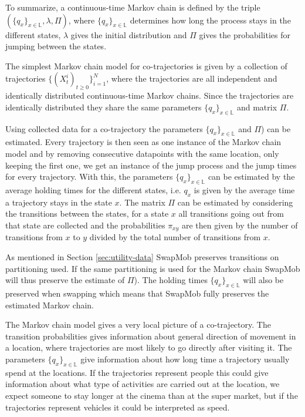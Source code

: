 \documentclass[12pt]{article}
\newcommand{\locset}{\mathbb{L}}
\theoremstyle{definition}
\begin{document}
To summarize, a continuous-time Markov chain is defined by the triple
\((\{q_{x}\}_{x \in \locset}, \lambda, \Pi)\), where
\(\{q_{x}\}_{x \in \locset}\) determines how long the process stays in
the different states, \(\lambda\) gives the initial distribution and
\(\Pi\) gives the probabilities for jumping between the states.

The simplest Markov chain model for co-trajectories is given by a
collection of trajectories \(\{(X_{t}^{i})_{t \geq 0}\}_{i = 1}^{N}\),
where the trajectories are all independent and identically distributed
continuous-time Markov chains. Since the trajectories are identically
distributed they share the same parameters
\(\{q_{x}\}_{x \in \locset}\) and matrix \(\Pi\).

Using collected data for a co-trajectory the parameters
\(\{q_{x}\}_{x \in \locset}\) and \(\Pi\)) can be estimated. Every
trajectory is then seen as one instance of the Markov chain model and
by removing consecutive datapoints with the same location, only
keeping the first one, we get an instance of the jump process and the
jump times for every trajectory. With this, the parameters
\(\{q_{x}\}_{x \in \locset}\) can be estimated by the average holding
times for the different states, i.e. \(q_{x}\) is given by the average
time a trajectory stays in the state \(x\). The matrix \(\Pi\) can be
estimated by considering the transitions between the states, for a
state \(x\) all transitions going out from that state are collected
and the probabilities \(\pi_{xy}\) are then given by the number of
transitions from \(x\) to \(y\) divided by the total number of
transitions from \(x\).

As mentioned in Section \ref{sec:utility-data} SwapMob preserves
transitions on partitioning used. If the same partitioning is used for
the Markov chain SwapMob will thus preserve the estimate of \(\Pi\)).
The holding times \(\{q_{x}\}_{x \in \locset}\) will also be preserved
when swapping which means that SwapMob fully preserves the estimated
Markov chain.

The Markov chain model gives a very local picture of a co-trajectory.
The transition probabilities gives information about general direction
of movement in a location, where trajectories are most likely to go
directly after visiting it. The parameters
\(\{q_{x}\}_{x \in \locset}\) give information about how long time a
trajectory usually spend at the locations. If the trajectories
represent people this could give information about what type of
activities are carried out at the location, we expect someone to stay
longer at the cinema than at the super market, but if the trajectories
represent vehicles it could be interpreted as speed.
\end{document}
